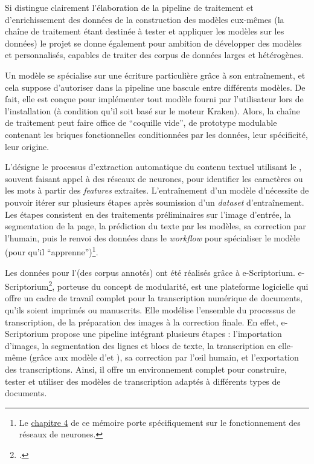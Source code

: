 Si \gaga distingue
clairement l'élaboration de la pipeline de traitement et
d'enrichissement des données de la construction des modèles eux-mêmes (la chaîne de traitement étant destinée à tester et appliquer les modèles sur les données) le projet se donne également pour ambition de développer des modèles \htr et \tal
personnalisés, capables de traiter des corpus de données larges et
hétérogènes.

Un modèle \htr se spécialise sur une écriture particulière
grâce à son entraînement, et cela suppose d'autoriser dans la pipeline
une bascule entre différents modèles. De fait, elle est conçue pour
implémenter tout modèle fourni par l'utilisateur lors de l'installation
(à condition qu'il soit basé sur le moteur Kraken). Alors, la chaîne de
traitement peut faire office de ``coquille vide'', de prototype
modulable contenant les briques fonctionnelles conditionnées par les
données, leur spécificité, leur origine.

L'\htr désigne le processus d'extraction automatique du contenu textuel
utilisant le \ml, souvent faisant appel à des réseaux de
neurones, pour identifier les caractères ou les mots à partir des
\emph{features} extraites. L'entraînement d'un
modèle d'\htr nécessite de pouvoir itérer sur plusieurs étapes après
soumission d'un \textit{dataset} d'entraînement. Les étapes consistent en des
traitements préliminaires sur l'image d'entrée, la segmentation de la
page, la prédiction du texte par les modèles, sa correction par
l'humain, puis le renvoi des données dans le \textit{workflow} pour
spécialiser le modèle (pour qu'il ``apprenne'')\footnote{Le \hyperlink{chapitre-4-modele}{chapitre 4} de ce mémoire porte spécifiquement sur le fonctionnement des réseaux de neurones.}.

Les données pour l'\htr (des corpus annotés) ont été réalisés grâce à
e-Scriptorium. e-Scriptorium\footcite{noauthor_escriptorium_nodate}, porteuse du concept de modularité, est une plateforme logicielle qui offre un cadre de travail complet pour la transcription numérique de documents, qu'ils soient imprimés ou manuscrits. Elle modélise l'ensemble du processus de transcription, de la préparation des images à la correction finale. En effet, e-Scriptorium propose une pipeline intégrant plusieurs étapes : l'importation d'images, la segmentation des lignes et blocs de texte, la transcription en elle-même (grâce aux modèle d'\ocr et \htr), sa correction par l'œil humain, et l'exportation des transcriptions. Ainsi, il offre un environnement complet pour construire, tester et utiliser des modèles de transcription adaptés à différents types de documents. 

